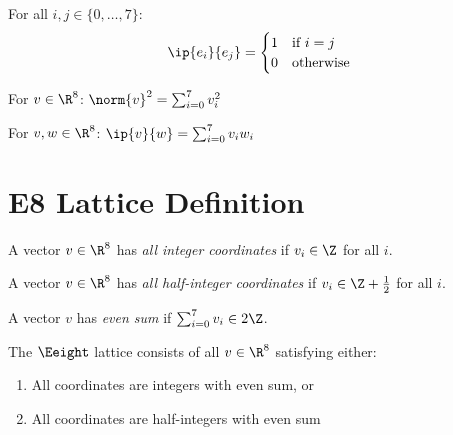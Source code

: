 \begin{theorem}\label{thm:stdBasis_orthonormal}
    \leanok
    For all $i, j \in \{0, \ldots, 7\}$:
    \[
        \ip{e_i}{e_j} = \begin{cases} 1 & \text{if } i = j \\ 0 & \text{otherwise} \end{cases}
    \]
\end{theorem}

\begin{theorem}\label{thm:normSq_eq_sum}
    \leanok
    For $v \in \R^8$: $\norm{v}^2 = \sum_{i=0}^{7} v_i^2$
\end{theorem}

\begin{theorem}\label{thm:inner_eq_sum}
    \leanok
    For $v, w \in \R^8$: $\ip{v}{w} = \sum_{i=0}^{7} v_i w_i$
\end{theorem}

\section{E8 Lattice Definition}

\begin{definition}\label{def:AllInteger}
    \leanok
    A vector $v \in \R^8$ has \emph{all integer coordinates} if $v_i \in \Z$ for all $i$.
\end{definition}

\begin{definition}\label{def:AllHalfInteger}
    \leanok
    A vector $v \in \R^8$ has \emph{all half-integer coordinates} if
    $v_i \in \Z + \frac{1}{2}$ for all $i$.
\end{definition}

\begin{definition}\label{def:SumEven}
    \leanok
    A vector $v$ has \emph{even sum} if $\sum_{i=0}^{7} v_i \in 2\Z$.
\end{definition}

\begin{definition}[E8 Lattice]\label{def:E8_lattice}
    \leanok
    The $\Eeight$ lattice consists of all $v \in \R^8$ satisfying either:
    \begin{enumerate}
        \item All coordinates are integers with even sum, or
        \item All coordinates are half-integers with even sum
    \end{enumerate}
\end{definition}

